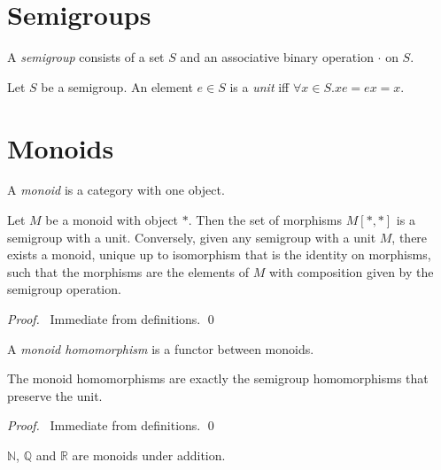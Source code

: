 \chapter{Semigroups}

\begin{df}[Semigroup]
A \emph{semigroup} consists of a set $S$ and an associative binary operation $\cdot$ on $S$.
\end{df}

\begin{df}[Unit]
Let $S$ be a semigroup. An element $e \in S$ is a \emph{unit} iff $\forall x \in S. xe = ex = x$.
\end{df}

\chapter{Monoids}

\begin{df}[Monoid]
A \emph{monoid} is a category with one object.
\end{df}

\begin{prop}
Let $M$ be a monoid with object $*$. Then the set of morphisms $M[*,*]$ is a semigroup with a unit. Conversely, given any semigroup with a unit $M$, there exists a monoid, unique up to isomorphism that is the identity on morphisms, such that the morphisms are the elements of $M$ with composition given by the semigroup operation.
\end{prop}

\begin{proof}
\pf\ Immediate from definitions. \qed
\end{proof}

\begin{df}
A \emph{monoid homomorphism} is a functor between monoids.
\end{df}

\begin{prop}
The monoid homomorphisms are exactly the semigroup homomorphisms that preserve the unit.
\end{prop}

\begin{proof}
\pf\ Immediate from definitions. \qed
\end{proof}

\begin{ex}
$\mathbb{N}$, $\mathbb{Q}$ and $\mathbb{R}$ are monoids under addition.
\end{ex}

